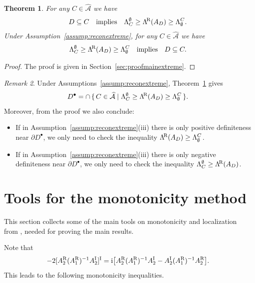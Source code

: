 \documentclass[reqno]{amsart}
\numberwithin{equation}{section}
\numberwithin{figure}{section}
\numberwithin{table}{section}
\theoremstyle{plain}
\newtheorem{theorem}{Theorem}[section]
\theoremstyle{definition}
\theoremstyle{remark}
\newtheorem{remark}[theorem]{Remark}
\newcommand{\I}{\mathrm{i}}    %
\newcommand{\upR}{^{\textup{R}}}
\newcommand{\upI}{^{\textup{I}}}
\newcommand{\uptR}{^{\!\textup{R}}}
\newcommand{\LambdaR}{\Lambda\uptR}
\newcommand{\AR}{A\upR}
\newcommand{\AI}{A\upI}
\begin{document}
	\begin{theorem} \label{thm:mainextreme}
		For any $C\in\widehat{\mathcal{A}}$ we have
		\begin{equation*}
			D \subseteq C \quad \text{implies} \quad \Lambda_C^{\emptyset} \geq \LambdaR(A_D) \geq \Lambda_{\emptyset}^C.
		\end{equation*}
		Under Assumption~\ref{assump:reconextreme}, for any $C\in\widehat{\mathcal{A}}$ we have
		\begin{equation*}
			\Lambda_C^{\emptyset} \geq \LambdaR(A_D) \geq \Lambda_{\emptyset}^C \quad \text{implies} \quad D \subseteq C.
		\end{equation*}
	\end{theorem}
	\begin{proof}
		The proof is given in Section~\ref{sec:proofmainextreme}.
	\end{proof}
	
	\begin{remark}
		Under Assumptions~\ref{assump:reconextreme}, Theorem~\ref{thm:mainextreme} gives
		\begin{equation*}
			D^\bullet = \cap\, \{\, C\in\widehat{\mathcal{A}} \mid \Lambda_C^{\emptyset} \geq \LambdaR(A_D) \geq \Lambda_{\emptyset}^C \,\}.
		\end{equation*}
		Moreover, from the proof we also conclude:
		\begin{itemize}
			\item If in Assumption~\ref{assump:reconextreme}(iii) there is only positive definiteness near $\partial D^\bullet$, we only need to check the inequality $\LambdaR(A_D) \geq \Lambda_{\emptyset}^C$.
			\item If in Assumption~\ref{assump:reconextreme}(iii) there is only negative definiteness near $\partial D^\bullet$, we only need to check the inequality $\Lambda_C^{\emptyset} \geq \LambdaR(A_D)$.
		\end{itemize} 
	\end{remark}
	
	\section{Tools for the monotonicity method} \label{sec:tools}
	
	This section collects some of the main tools on monotonicity and localization from \cite{GJZ2025}, needed for proving the main results.
	
	Note that 
	\begin{equation*}
		-2[\AR_2(\AR_1)^{-1}\AI_2]\upI = \I\bigl[\AR_2(\AR_1)^{-1}\AI_2 - \AI_2(\AR_1)^{-1}\AR_2\bigr].
	\end{equation*}
	This leads to the following monotonicity inequalities.
	
\end{document}
